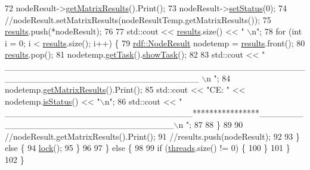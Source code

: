 \begin{DoxyCode}
72             nodeResult->\hyperlink{classrdf_1_1NodeResult_ab0d07def4def30c0875602c5e3dde208}{getMatrixResults}().Print();
73             nodeResult->\hyperlink{classrdf_1_1NodeResult_a52df0a39fb56beec66feacf802639b2c}{setStatus}(0);
74             \textcolor{comment}{//nodeResult.setMatrixResults(nodeResultTemp.getMatrixResults());}
75             \hyperlink{classScheduler_a93faf0df4ed95016cdb5224bd2725c3f}{results}.push(*nodeResult);
76             
77             std::cout << \hyperlink{classScheduler_a93faf0df4ed95016cdb5224bd2725c3f}{results}.size() << \textcolor{stringliteral}{" \(\backslash\)n"};
78             \textcolor{keywordflow}{for} (\textcolor{keywordtype}{int} i = 0; i < \hyperlink{classScheduler_a93faf0df4ed95016cdb5224bd2725c3f}{results}.size(); i++) \{
79                  \hyperlink{classrdf_1_1NodeResult}{rdf::NodeResult} nodetemp = \hyperlink{classScheduler_a93faf0df4ed95016cdb5224bd2725c3f}{results}.front();
80                  \hyperlink{classScheduler_a93faf0df4ed95016cdb5224bd2725c3f}{results}.pop();
81                  nodetemp.\hyperlink{classrdf_1_1NodeResult_a564d581492a48333ed9796f6fd4b8c6a}{getTask}().\hyperlink{classrdf_1_1Task_aed5f96455f9684078a5fa8fce849d197}{showTask}();
82                  
83                  std::cout << \textcolor{stringliteral}{"
      \_\_\_\_\_\_\_\_\_\_\_\_\_\_\_\_\_\_\_\_\_\_\_\_\_\_\_\_\_\_\_\_\_\_\_\_\_\_\_\_\_\_\_\_\_\_\_\_\_\_\_\_\_\_\_\_\_\_\_\_\_\_\_\_\_\_\_\_\_\_\_\_\_\_\_\_\_\_\_ \(\backslash\)n "};
84                  nodetemp.\hyperlink{classrdf_1_1NodeResult_ab0d07def4def30c0875602c5e3dde208}{getMatrixResults}().Print();
85                  std::cout << \textcolor{stringliteral}{"CE: "} << nodetemp.\hyperlink{classrdf_1_1NodeResult_a09ad0a96c0591976f73ef288eff195c7}{isStatus}() << \textcolor{stringliteral}{"\(\backslash\)n"};
86                  std::cout << \textcolor{stringliteral}{"
      \_\_\_\_\_\_\_\_\_\_\_\_\_\_\_\_\_\_\_\_\_\_\_\_\_\_\_\_\_\_****************\_\_\_\_\_\_\_\_\_\_\_\_\_\_\_\_\_\_\_\_\_\_\_\_\_\_\_\_\_\_\_\_\_\_\(\backslash\)n "};
87 
88             \}
89 
90             \textcolor{comment}{//nodeResult.getMatrixResults().Print();}
91             \textcolor{comment}{//results.push(nodeResult);}
92 
93         \} \textcolor{keywordflow}{else} \{
94             \hyperlink{classScheduler_a903ad54edab99f678aef0f79e2b426f8}{lock}();
95         \}
96 
97     \} \textcolor{keywordflow}{else} \{
98 
99         \textcolor{keywordflow}{if} (\hyperlink{classScheduler_a99f7fcd7cb3977cb7e76232a01aceffe}{threads}.size() != 0) \{
100         \}
101     \}
102 \}
\end{DoxyCode}
